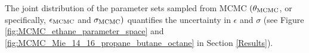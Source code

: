 \documentclass[preprint,letterpaper,floatfix,citeautoscript,aip,jcp]{revtex4-1}
\begin{document}
The 
joint distribution of the
parameter sets sampled from MCMC $(\theta_{\rm MCMC}$, or specifically, $\epsilon_{\rm MCMC}$ and $\sigma_{\rm MCMC})$ quantifies the uncertainty in $\epsilon$ and $\sigma$ (see Figure \ref{fig:MCMC_ethane_parameter_space} and \ref{fig:MCMC_Mie_14_16_propane_butane_octane} in Section \ref{Results}). 
%
\end{document}
